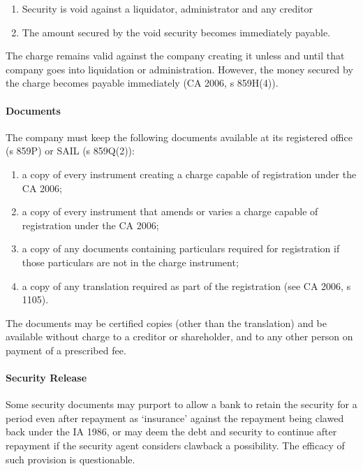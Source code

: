\documentclass[
]{article}
\providecommand{\tightlist}{%
  \setlength{\itemsep}{0pt}\setlength{\parskip}{0pt}}
\begin{document}
\begin{enumerate}
\def\labelenumi{\arabic{enumi}.}
\tightlist
\item
  Security is void against a liquidator, administrator and any creditor
\item
  The amount secured by the void security becomes immediately payable.
\end{enumerate}

The charge remains valid against the company creating it unless and
until that company goes into liquidation or administration. However, the
money secured by the charge becomes payable immediately (CA 2006, s
859H(4)).

\hypertarget{documents}{%
\paragraph{Documents}\label{documents}}

The company must keep the following documents available at its
registered office (s 859P) or SAIL (s 859Q(2)):

\begin{enumerate}
\def\labelenumi{\arabic{enumi}.}
\tightlist
\item
  a copy of every instrument creating a charge capable of registration
  under the CA 2006;
\item
  a copy of every instrument that amends or varies a charge capable of
  registration under the CA 2006;
\item
  a copy of any documents containing particulars required for
  registration if those particulars are not in the charge instrument;
\item
  a copy of any translation required as part of the registration (see CA
  2006, s 1105).
\end{enumerate}

The documents may be certified copies (other than the translation) and
be available without charge to a creditor or shareholder, and to any
other person on payment of a prescribed fee.

\hypertarget{security-release}{%
\paragraph{Security Release}\label{security-release}}

Some security documents may purport to allow a bank to retain the
security for a period even after repayment as `insurance' against the
repayment being clawed back under the IA 1986, or may deem the debt and
security to continue after repayment if the security agent considers
clawback a possibility. The efficacy of such provision is questionable.
\end{document}
